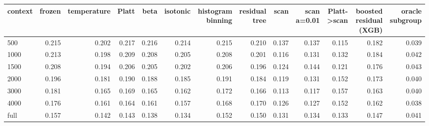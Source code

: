 \begin{tabular}{lrrrrrrrrrrrr}
\toprule
context & frozen & temperature & Platt & beta & isotonic & histogram binning & residual tree & scan & scan a=0.01 & Platt->scan & boosted residual (XGB) & oracle subgroup \\
\midrule
500 & 0.215 & 0.202 & 0.217 & 0.216 & 0.214 & 0.215 & 0.210 & 0.137 & 0.137 & 0.115 & 0.182 & 0.039 \\
1000 & 0.213 & 0.198 & 0.209 & 0.208 & 0.205 & 0.208 & 0.201 & 0.116 & 0.131 & 0.132 & 0.184 & 0.042 \\
1500 & 0.208 & 0.194 & 0.206 & 0.205 & 0.202 & 0.206 & 0.196 & 0.124 & 0.144 & 0.121 & 0.176 & 0.043 \\
2000 & 0.196 & 0.181 & 0.190 & 0.188 & 0.185 & 0.191 & 0.184 & 0.119 & 0.131 & 0.152 & 0.173 & 0.040 \\
3000 & 0.181 & 0.165 & 0.169 & 0.165 & 0.162 & 0.172 & 0.166 & 0.113 & 0.117 & 0.157 & 0.163 & 0.040 \\
4000 & 0.176 & 0.161 & 0.164 & 0.161 & 0.157 & 0.168 & 0.170 & 0.126 & 0.127 & 0.152 & 0.162 & 0.038 \\
full & 0.157 & 0.142 & 0.143 & 0.138 & 0.134 & 0.152 & 0.150 & 0.131 & 0.134 & 0.133 & 0.147 & 0.041 \\
\bottomrule
\end{tabular}
